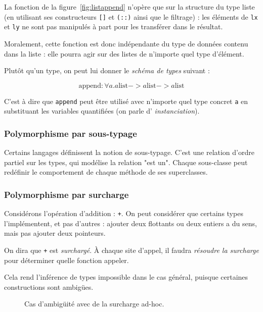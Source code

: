La fonction de la figure~\ref{fig:listappend} n'opère que sur la structure du type
liste (en utilisant ses constructeurs \texttt{{[}{]}} et \texttt{(::)} ainsi que
le filtrage) : les éléments de \texttt{lx} et \texttt{ly} ne sont pas manipulés
à part pour les transférer dans le résultat.

Moralement, cette fonction est donc indépendante du type de données contenu dans
la liste : elle pourra agir sur des listes de n'importe quel type d'élément.

Plutôt qu'un type, on peut lui donner le \emph{schéma de types} suivant :

\[
  \textrm{append} : \forall a . a \textrm{list}
                             -> a \textrm{list}
                             -> a \textrm{list}
\]

C'est à dire que \texttt{append} peut être utilisé avec n'importe quel type
concret \texttt{a} en substituant les variables quantifiées (on parle d'
\emph{instanciation}).

\subsubsection{Polymorphisme par sous-typage}


Certains langages définissent la notion de sous-typage. C'est une relation
d'ordre partiel sur les types, qui modélise la relation "est un". Chaque
sous-classe peut redéfinir le comportement de chaque méthode de ses
superclasses.

\subsubsection{Polymorphisme par surcharge}

Considérons l'opération d'addition : \texttt{+}. On peut considérer que certains
types l'implémentent, et pas d'autres : ajouter deux flottants ou deux entiers a
du sens, mais pas ajouter deux pointeurs.

On dira que \texttt{+} est \emph{surchargé}. À chaque site d'appel, il faudra
\emph{résoudre la surcharge} pour déterminer quelle fonction appeler.

Cela rend l'inférence de types 
impossible dans le cas général, puisque certaines constructions sont ambigües.

\begin{figure}
  \caption{Cas d'ambigüité avec de la surcharge ad-hoc.}
  \label{fig:showread}
\end{figure}

